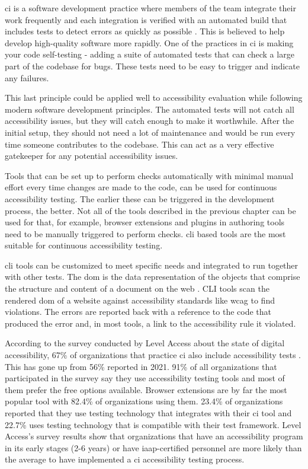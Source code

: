 \documentclass{master_thesis}
\begin{document}
\Ac{ci} is a software development practice where members of the team integrate their work frequently and each integration is verified with an automated build that includes tests to detect errors as quickly as possible \citep{Fowler2006}. This is believed to help develop high-quality software more rapidly. One of the practices in \ac{ci} is making your code self-testing - adding a suite of automated tests that can check a large part of the codebase for bugs. These tests need to be easy to trigger and indicate any failures.

This last principle could be applied well to accessibility evaluation while following modern software development principles. The automated tests will not catch all accessibility issues, but they will catch enough to make it worthwhile. After the initial setup, they should not need a lot of maintenance and would be run every time someone contributes to the codebase. This can act as a very effective gatekeeper for any potential accessibility issues.

Tools that can be set up to perform checks automatically with minimal manual effort every time changes are made to the code, can be used for continuous accessibility testing. The earlier these can be triggered in the development process, the better. Not all of the tools described in the previous chapter can be used for that, for example, browser extensions and plugins in authoring tools need to be manually triggered to perform checks. \ac{cli} based tools are the most suitable for continuous accessibility testing.

\ac{cli} tools can be customized to meet specific needs and integrated to run together with other tests. The \ac{dom} is the data representation of the objects that comprise the structure and content of a document on the web \citep{MDN2023}. CLI tools scan the rendered \ac{dom} of a website against accessibility standards like \ac{wcag} to find violations. The errors are reported back with a reference to the code that produced the error and, in most tools, a link to the accessibility rule it violated.

According to the survey conducted by Level Access about the state of digital accessibility, 67\% of organizations that practice \ac{ci} also include accessibility tests \citep{LevelAccess}. This has gone up from 56\% reported in 2021. 91\% of all organizations that participated in the survey say they use accessibility testing tools and most of them prefer the free options available. Browser extensions are by far the most popular tool with 82.4\% of organizations using them. 23.4\% of organizations reported that they use testing technology that integrates with their \ac{ci} tool and 22.7\% uses testing technology that is compatible with their test framework. Level Access's survey results show that organizations that have an accessibility program in its early stages (2-6 years) or have \ac{iaap}-certified personnel are more likely than the average to have implemented a \ac{ci} accessibility testing process.
\end{document}
